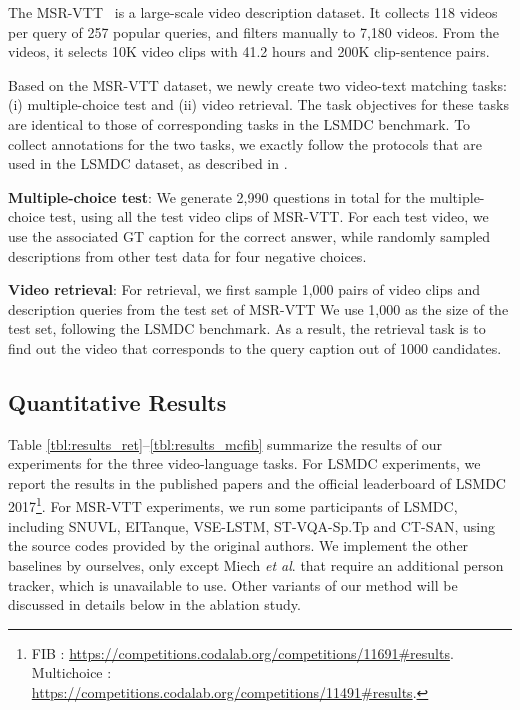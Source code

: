 \documentclass[runningheads]{llncs}
\makeatletter
\DeclareRobustCommand\onedot{\futurelet\@let@token\@onedot}
\def\onedot{.\@\xspace}
\def\etal{\textit{et al}\onedot}
\makeatother
\begin{document}
The MSR-VTT~\cite{xu-CVPR-2016} is a large-scale video description dataset. 
It collects 118 videos per query of 257 popular queries, and filters manually to 7,180 videos. From the videos, it selects 10K video clips with 41.2 hours and 200K clip-sentence pairs.

Based on the MSR-VTT dataset, we newly create two video-text matching tasks: (i) multiple-choice test and (ii) video retrieval. 
The task objectives for these tasks are identical to those of corresponding tasks in the LSMDC benchmark.
To collect annotations for the two tasks, we exactly follow the protocols that are used in the LSMDC dataset, as described in \cite{torabi-arxiv-2016}.

\textbf{Multiple-choice test}: 
We generate 2,990 questions in total for the multiple-choice test, using all the test video clips of MSR-VTT. For each test video, we use the associated GT caption for the correct answer, while randomly sampled descriptions from other test data for four negative choices.


\textbf{Video retrieval}:
For retrieval, we first sample 1,000 pairs of video clips and description queries from the test set of MSR-VTT
We use 1,000 as the size of the test set, following the LSMDC benchmark. 
As a result, the retrieval task is to find out the video that corresponds to the query caption out of 1000 candidates.



\subsection{Quantitative Results}
\label{sec:quant_results}


Table \ref{tbl:results_ret}--\ref{tbl:results_mcfib} summarize the results of our experiments for the three video-language tasks. 
For LSMDC experiments, we report the results in the published papers and the official leaderboard of LSMDC 2017\footnote{FIB : \url{https://competitions.codalab.org/competitions/11691\#results}. \\Multichoice : \url{https://competitions.codalab.org/competitions/11491\#results}.}. 
For MSR-VTT experiments, we run some participants of LSMDC, including SNUVL, EITanque, VSE-LSTM, ST-VQA-Sp.Tp and CT-SAN, using the source codes provided by the original authors. 
We implement the other baselines by ourselves, only except Miech \etal that require an additional person tracker, which is unavailable to use. Other variants of our method will be discussed in details below in the ablation study. 
\end{document}
